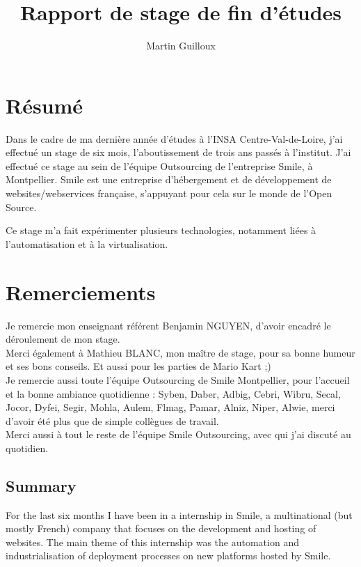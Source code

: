\documentclass[14 pt,a4paper]{extreport}
\title{\textbf{Rapport de stage de fin d'études}}
\author{Martin Guilloux}
\begin{document}
\maketitle


\section*{Résumé}
Dans le cadre de ma dernière année d'études à l'INSA Centre-Val-de-Loire, j'ai effectué un stage de six mois, l'aboutissement de trois ans passés à l'institut. J'ai effectué ce stage au sein de l'équipe Outsourcing de l'entreprise Smile, à Montpellier. Smile est une entreprise d'hébergement et de développement de websites/webservices française, s'appuyant pour cela sur le monde de l'Open Source.

Ce stage m'a fait expérimenter plusieurs technologies, notamment liées à l'automatisation et à la virtualisation.

\section*{Remerciements}
Je remercie mon enseignant référent Benjamin NGUYEN, d'avoir encadré le déroulement de mon stage.\\
Merci également à Mathieu BLANC, mon maître de stage, pour sa bonne humeur et ses bons conseils. Et aussi pour les parties de Mario Kart ;)\\ %
Je remercie aussi toute l'équipe Outsourcing de Smile Montpellier, pour l'accueil et la bonne ambiance quotidienne : Syben, Daber, Adbig, Cebri, Wibru, Secal, Jocor, Dyfei, Segir, Mohla, Aulem, Flmag, Pamar, Alniz, Niper, Alwie, merci d'avoir été plus que de simple collègues de travail.\\
Merci aussi à tout le reste de l'équipe Smile Outsourcing, avec qui j'ai discuté au quotidien. 


\tableofcontents

\newpage
\subsection*{Summary}

For the last six months I have been in a internship in Smile, a multinational (but mostly French) company that focuses on the development and hosting of websites. The main theme of this internship was the automation and industrialisation of deployment processes on new platforms hosted by Smile.
\end{document}
